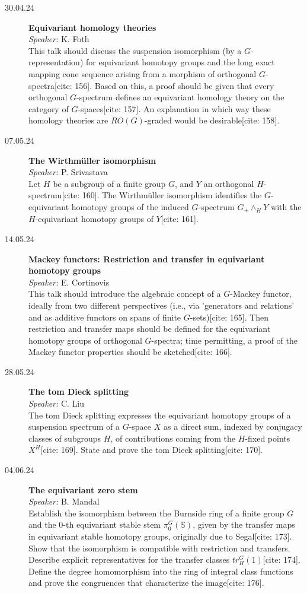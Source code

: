 \documentclass[11pt, openany]{book} %
\begin{document}
\begin{description}
\item[30.04.24] \textbf{Equivariant homology theories} \\
\textit{Speaker:} K. Foth \\
This talk should discuss the suspension isomorphism (by a $G$-representation) for equivariant homotopy groups and the long exact mapping cone sequence arising from a morphism of orthogonal $G$-spectra[cite: 156]. Based on this, a proof should be given that every orthogonal $G$-spectrum defines an equivariant homology theory on the category of $G$-spaces[cite: 157]. An explanation in which way these homology theories are $RO(G)$-graded would be desirable[cite: 158].

\item[07.05.24] \textbf{The Wirthmüller isomorphism} \\
\textit{Speaker:} P. Srivastava \\
Let $H$ be a subgroup of a finite group $G$, and $Y$ an orthogonal $H$-spectrum[cite: 160]. The Wirthmüller isomorphism identifies the $G$-equivariant homotopy groups of the induced $G$-spectrum $G_{+}\wedge_{H}Y$ with the $H$-equivariant homotopy groups of $Y$[cite: 161].

\item[14.05.24] \textbf{Mackey functors: Restriction and transfer in equivariant homotopy groups} \\
\textit{Speaker:} E. Cortinovis \\
This talk should introduce the algebraic concept of a $G$-Mackey functor, ideally from two different perspectives (i.e., via 'generators and relations' and as additive functors on spans of finite $G$-sets)[cite: 165]. Then restriction and transfer maps should be defined for the equivariant homotopy groups of orthogonal $G$-spectra; time permitting, a proof of the Mackey functor properties should be sketched[cite: 166].

\item[28.05.24] \textbf{The tom Dieck splitting} \\
\textit{Speaker:} C. Liu \\
The tom Dieck splitting expresses the equivariant homotopy groups of a suspension spectrum of a $G$-space $X$ as a direct sum, indexed by conjugacy classes of subgroups $H$, of contributions coming from the $H$-fixed points $X^{H}$[cite: 169]. State and prove the tom Dieck splitting[cite: 170].

\item[04.06.24] \textbf{The equivariant zero stem} \\
\textit{Speaker:} B. Mandal \\
Establish the isomorphism between the Burnside ring of a finite group $G$ and the 0-th equivariant stable stem $\pi_{0}^{G}(\mathbb{S})$, given by the transfer maps in equivariant stable homotopy groups, originally due to Segal[cite: 173]. Show that the isomorphism is compatible with restriction and transfers. Describe explicit representatives for the transfer classes $tr_{H}^{G}(1)$[cite: 174]. Define the degree homomorphism into the ring of integral class functions and prove the congruences that characterize the image[cite: 176].


\end{description}
\end{document}
